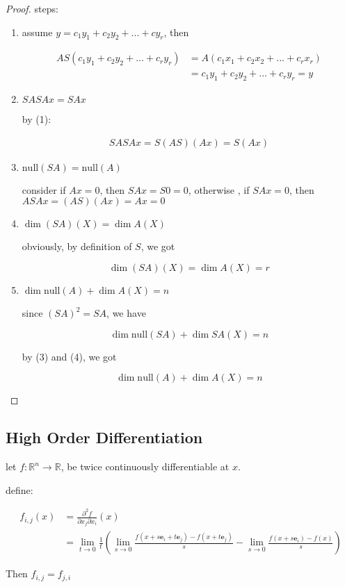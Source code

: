 \begin{proof}
    steps:

    \begin{enumerate}
        \item assume $y = c_1y_1 + c_2y_2 + ... + cy_r$, then

        \begin{align*}
            AS(c_1y_1 + c_2y_2 + ... + c_ry_r) & = A(c_1x_1 + c_2x_2 + ... + c_rx_r) \\
            &= c_1y_1 + c_2y_2 + ... + c_r y_r = y
        \end{align*}

        \item $SASAx = SAx$

        by (1):

        \begin{align*}
            SASAx = S(AS) (Ax) = S(Ax) 
        \end{align*}

        \item $\mathrm{null}(SA) = \mathrm{null}(A)$

        consider if $Ax = 0$, then $SAx = S0 = 0$, otherwise , if $SAx = 0$, then $ASAx = (AS)(Ax) = Ax = 0$

        \item $\dim (SA)(X) = \dim A(X)$

        obviously, by definition of $S$, we got

        \[
\dim (SA)(X) = \dim A(X) = r
        \]

        \item $\dim \mathrm{null}(A) + \dim A(X) = n$

        since $(SA)^2 = SA$, we have 

        \[
            \dim \mathrm{null} (SA) + \dim SA(X) = n
        \]

        by (3) and (4), we got

        \[
            \dim \mathrm{null} (A) + \dim A(X) = n
        \]

    \end{enumerate}
\end{proof}


\subsection{High Order Differentiation}

\begin{thm}
    let $f: \mathbb{R}^n \to \mathbb{R}$, be twice continuously differentiable at $x$.

    define:


    \begin{align*}
        f_{i,j}(x) &= \frac{\partial^2 f}{\partial x_j \partial x_i}(x) \\
        &= \lim_{t \to 0}\frac{1}{t}\left(\lim_{s \to 0}\frac{f(x + s\mathbf{e}_i+ t \mathbf{e}_j)- f(x + t \mathbf{e}_j)}{s}- \lim_{s \to 0}\frac{f(x + s\mathbf{e}_i)-f(x)}{s}\right)
    \end{align*}

    Then $f_{i,j} = f_{j,i}$
\end{thm}

